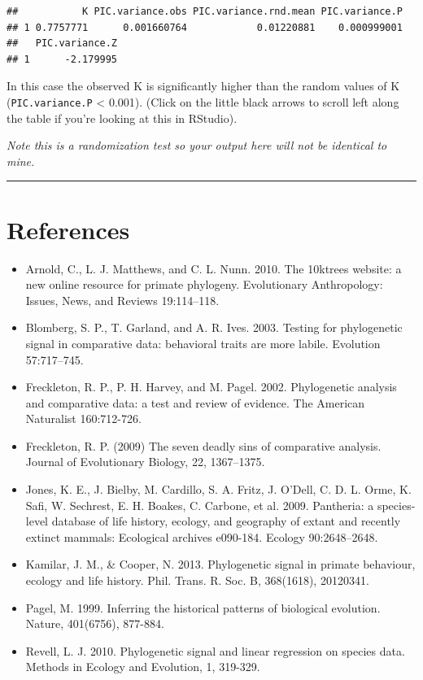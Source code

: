 \documentclass[]{book}
\providecommand{\tightlist}{%
  \setlength{\itemsep}{0pt}\setlength{\parskip}{0pt}}
\begin{document}
\begin{verbatim}
##           K PIC.variance.obs PIC.variance.rnd.mean PIC.variance.P
## 1 0.7757771      0.001660764            0.01220881    0.000999001
##   PIC.variance.Z
## 1      -2.179995
\end{verbatim}

In this case the observed K is significantly higher than the random
values of K (\texttt{PIC.variance.P} \textless{} 0.001). (Click on the
little black arrows to scroll left along the table if you're looking at
this in RStudio).

\emph{Note this is a randomization test so your output here will not be
identical to mine.}

\begin{center}\rule{0.5\linewidth}{\linethickness}\end{center}

\section{References}\label{references-1}

\begin{itemize}
\tightlist
\item
  Arnold, C., L. J. Matthews, and C. L. Nunn. 2010. The 10ktrees
  website: a new online resource for primate phylogeny. Evolutionary
  Anthropology: Issues, News, and Reviews 19:114--118.
\item
  Blomberg, S. P., T. Garland, and A. R. Ives. 2003. Testing for
  phylogenetic signal in comparative data: behavioral traits are more
  labile. Evolution 57:717--745.
\item
  Freckleton, R. P., P. H. Harvey, and M. Pagel. 2002. Phylogenetic
  analysis and comparative data: a test and review of evidence. The
  American Naturalist 160:712-726.
\item
  Freckleton, R. P. (2009) The seven deadly sins of comparative
  analysis. Journal of Evolutionary Biology, 22, 1367--1375.
\item
  Jones, K. E., J. Bielby, M. Cardillo, S. A. Fritz, J. O'Dell, C. D. L.
  Orme, K. Safi, W. Sechrest, E. H. Boakes, C. Carbone, et al. 2009.
  Pantheria: a species-level database of life history, ecology, and
  geography of extant and recently extinct mammals: Ecological archives
  e090-184. Ecology 90:2648--2648.
\item
  Kamilar, J. M., \& Cooper, N. 2013. Phylogenetic signal in primate
  behaviour, ecology and life history. Phil. Trans. R. Soc. B,
  368(1618), 20120341.
\item
  Pagel, M. 1999. Inferring the historical patterns of biological
  evolution. Nature, 401(6756), 877-884.
\item
  Revell, L. J. 2010. Phylogenetic signal and linear regression on
  species data. Methods in Ecology and Evolution, 1, 319-329.
\end{itemize}
\end{document}
